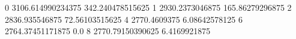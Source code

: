 0 3106.614990234375 342.240478515625
1 2930.2373046875 165.86279296875
2 2836.935546875 72.56103515625
4 2770.4609375 6.08642578125
6 2764.37451171875 0.0
8 2770.79150390625 6.4169921875
